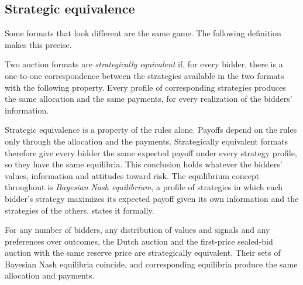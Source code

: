 \subsection{Strategic equivalence}\label{sec:14-formats-equiv}

Some formats that look different are the same game. The following definition makes this precise.

\begin{definition}\label{def:14-strat-equiv}
Two auction formats are \emph{strategically equivalent} if, for every bidder, there is a one-to-one
correspondence between the strategies available in the two formats with the following property. Every
profile of corresponding strategies produces the same allocation and the same payments, for every
realization of the bidders' information.
\end{definition}

Strategic equivalence is a property of the rules alone. Payoffs depend on the rules only through the
allocation and the payments. Strategically equivalent formats therefore give every bidder the same expected
payoff under every strategy profile, so they have the same equilibria. This conclusion holds whatever the
bidders' values, information and attitudes toward risk. The equilibrium concept throughout is
\emph{Bayesian Nash equilibrium}, a profile of strategies in which each bidder's strategy maximizes its
expected payoff given its own information and the strategies of the others.  states it
formally.

\begin{proposition}\label{prop:14-dutch-fpa}
For any number of bidders, any distribution of values and signals and any preferences over outcomes,
the Dutch auction and the first-price sealed-bid auction with the same reserve price are strategically
equivalent. Their sets of Bayesian Nash equilibria coincide, and corresponding equilibria produce the same
allocation and payments.
\end{proposition}

